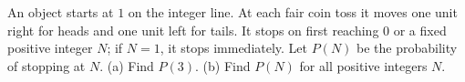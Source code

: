An object starts at $1$ on the integer line. At each fair coin toss it moves one unit right for heads and one unit left for tails. It stops on first reaching $0$ or a fixed positive integer $N$; if $N=1$, it stops immediately. Let $P(N)$ be the probability of stopping at $N$.
(a) Find $P(3)$. (b) Find $P(N)$ for all positive integers $N$.
